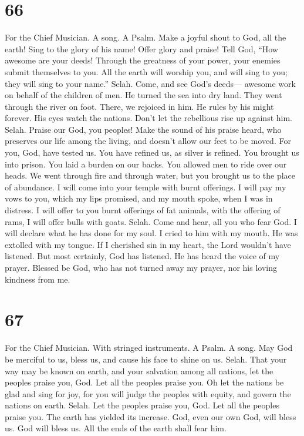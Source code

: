 \hypertarget{section-64}{%
\section{66}\label{section-64}}

For the Chief Musician. A song. A Psalm.  Make a joyful
shout to God, all the earth!  Sing to the glory of his name!
Offer glory and praise!  Tell God, ``How awesome are your
deeds! Through the greatness of your power, your enemies submit
themselves to you.  All the earth will worship you, and will
sing to you; they will sing to your name.'' Selah.  Come,
and see God's deeds--- awesome work on behalf of the children of men.
 He turned the sea into dry land. They went through the
river on foot. There, we rejoiced in him.  He rules by his
might forever. His eyes watch the nations. Don't let the rebellious rise
up against him. Selah.  Praise our God, you peoples! Make
the sound of his praise heard,  who preserves our life among
the living, and doesn't allow our feet to be moved.  For
you, God, have tested us. You have refined us, as silver is refined.
 You brought us into prison. You laid a burden on our
backs.  You allowed men to ride over our heads. We went
through fire and through water, but you brought us to the place of
abundance.  I will come into your temple with burnt
offerings. I will pay my vows to you,  which my lips
promised, and my mouth spoke, when I was in distress.  I
will offer to you burnt offerings of fat animals, with the offering of
rams, I will offer bulls with goats. Selah.  Come and hear,
all you who fear God. I will declare what he has done for my soul.
 I cried to him with my mouth. He was extolled with my
tongue.  If I cherished sin in my heart, the Lord wouldn't
have listened.  But most certainly, God has listened. He
has heard the voice of my prayer.  Blessed be God, who has
not turned away my prayer, nor his loving kindness from me.

\hypertarget{section-65}{%
\section{67}\label{section-65}}

For the Chief Musician. With stringed instruments. A Psalm. A song.
 May God be merciful to us, bless us, and cause his face to
shine on us. Selah.  That your way may be known on earth,
and your salvation among all nations,  let the peoples
praise you, God. Let all the peoples praise you.  Oh let the
nations be glad and sing for joy, for you will judge the peoples with
equity, and govern the nations on earth. Selah.  Let the
peoples praise you, God. Let all the peoples praise you. 
The earth has yielded its increase. God, even our own God, will bless
us.  God will bless us. All the ends of the earth shall fear
him.

